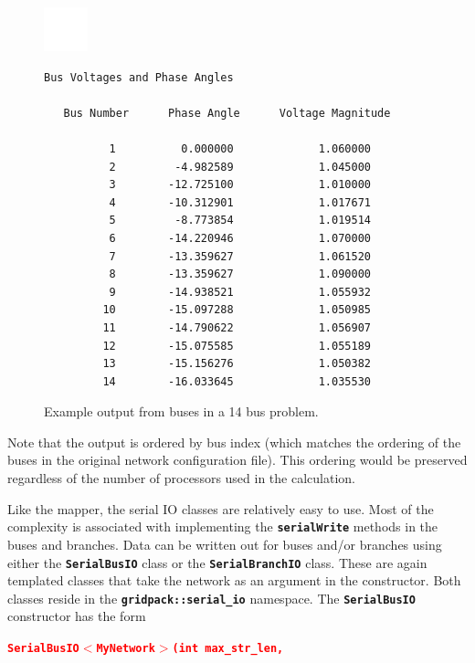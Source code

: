 \documentclass[12pt]{report} %
\begin{document}
\begin{figure}
  \centering
    \includegraphics*[width=0.5in, height=0.5in, keepaspectratio=true]{20pix-white-square}

{
\color{red}
\bfseries
\begin{Verbatim}[commandchars=\\\{\}]
   Bus Voltages and Phase Angles

   Bus Number      Phase Angle      Voltage Magnitude

          1          0.000000             1.060000
          2         -4.982589             1.045000
          3        -12.725100             1.010000
          4        -10.312901             1.017671
          5         -8.773854             1.019514
          6        -14.220946             1.070000
          7        -13.359627             1.061520
          8        -13.359627             1.090000
          9        -14.938521             1.055932
         10        -15.097288             1.050985
         11        -14.790622             1.056907
         12        -15.075585             1.055189
         13        -15.156276             1.050382
         14        -16.033645             1.035530
\end{Verbatim}
}
  \caption{Example output from buses in a 14 bus problem.}
  \label{fig:fig-8}
\end{figure}

Note that the output is ordered by bus index (which matches the ordering of the buses in the original network configuration file). This ordering would be preserved regardless of the number of processors used in the calculation.

Like the mapper, the serial IO classes are relatively easy to use. Most of the complexity is associated with implementing the \texttt{\textbf{serialWrite}} methods in the buses and branches. Data can be written out for buses and/or branches using either the \texttt{\textbf{SerialBusIO}} class or the \texttt{\textbf{SerialBranchIO}} class. These are again templated classes that take the network as an argument in the constructor. Both classes reside in the \texttt{\textbf{gridpack::serial\_io}} namespace. The \texttt{\textbf{SerialBusIO}} constructor has the form

\textcolor{red}{\texttt{\textbf{SerialBusIO$\boldsymbol{\mathrm{<}}$MyNetwork$\boldsymbol{\mathrm{>}}$(int max\_str\_len,}}}
\end{document}
